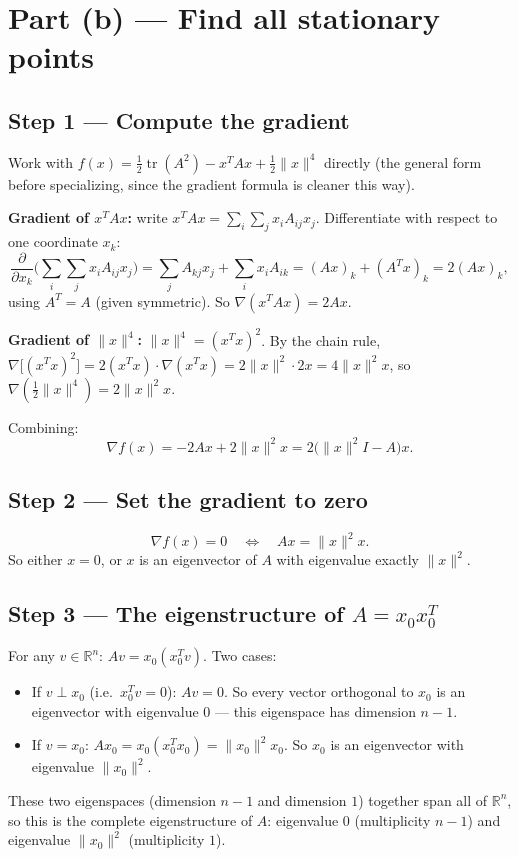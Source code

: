 \documentclass[11pt]{article}
\newcommand{\R}{\mathbb{R}}
\newcommand{\tr}{\operatorname{tr}}
\begin{document}
\section*{Part (b) --- Find all stationary points}

\subsection*{Step 1 --- Compute the gradient}

Work with $f(x) = \tfrac12\tr(A^2) - x^TAx + \tfrac12\|x\|^4$ directly (the general form before specializing, since the gradient formula is cleaner this way).

\textbf{Gradient of $x^TAx$:} write $x^TAx = \sum_i\sum_j x_iA_{ij}x_j$. Differentiate with respect to one coordinate $x_k$:
\[
\frac{\partial}{\partial x_k}\Big(\sum_i\sum_j x_iA_{ij}x_j\Big) = \sum_j A_{kj}x_j + \sum_i x_iA_{ik} = (Ax)_k + (A^Tx)_k = 2(Ax)_k,
\]
using $A^T=A$ (given symmetric). So $\nabla(x^TAx) = 2Ax$.

\textbf{Gradient of $\|x\|^4$:} $\|x\|^4 = (x^Tx)^2$. By the chain rule, $\nabla\big[(x^Tx)^2\big] = 2(x^Tx)\cdot\nabla(x^Tx) = 2\|x\|^2\cdot 2x = 4\|x\|^2x$, so $\nabla(\tfrac12\|x\|^4) = 2\|x\|^2x$.

Combining:
\[
\nabla f(x) = -2Ax + 2\|x\|^2x = 2\big(\|x\|^2I - A\big)x.
\]

\subsection*{Step 2 --- Set the gradient to zero}

\[
\nabla f(x) = 0 \quad\Longleftrightarrow\quad Ax = \|x\|^2x.
\]
So either $x=0$, or $x$ is an eigenvector of $A$ with eigenvalue exactly $\|x\|^2$.

\subsection*{Step 3 --- The eigenstructure of $A=x_0x_0^T$}

For any $v\in\R^n$: $Av = x_0(x_0^Tv)$. Two cases:
\begin{itemize}[leftmargin=1.5em]
\item If $v\perp x_0$ (i.e.\ $x_0^Tv=0$): $Av=0$. So every vector orthogonal to $x_0$ is an eigenvector with eigenvalue $0$ --- this eigenspace has dimension $n-1$.
\item If $v=x_0$: $Ax_0 = x_0(x_0^Tx_0) = \|x_0\|^2x_0$. So $x_0$ is an eigenvector with eigenvalue $\|x_0\|^2$.
\end{itemize}
These two eigenspaces (dimension $n-1$ and dimension $1$) together span all of $\R^n$, so this is the complete eigenstructure of $A$: eigenvalue $0$ (multiplicity $n-1$) and eigenvalue $\|x_0\|^2$ (multiplicity $1$).
\end{document}
